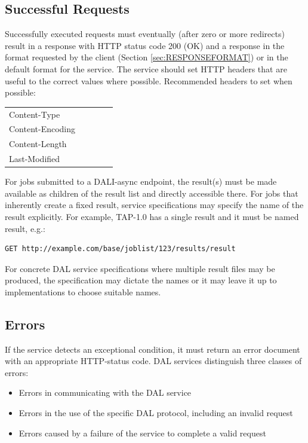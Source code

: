 \documentclass[11pt,letter]{ivoa}
\begin{document}
\subsection{Successful Requests}
\label{sec:response-ok}
Successfully executed requests must eventually (after zero or more redirects)
result in a response with HTTP status code 200 (OK) and a response in the format
requested by the client (Section \ref{sec:RESPONSEFORMAT}) or in the default format for the
service. The service should set HTTP headers \citep{std:HTTP} that are useful to the correct values
where possible. Recommended headers to set when possible:

\begin{tabular}{l l l l l}
\label{tab:headers}
Content-Type \\
Content-Encoding \\
Content-Length \\
Last-Modified \\
\end{tabular}

For jobs submitted to a DALI-async endpoint, the result(s) must be made
available as children of the result list and directly accessible there.
For jobs that inherently create a fixed result, service specifications may
specify the name of the result explicitly. For example, TAP-1.0 has a single
result and it must be named result, e.g.:

\begin{verbatim}
GET http://example.com/base/joblist/123/results/result
\end{verbatim}

For concrete DAL service specifications where multiple result files may be
produced, the specification may dictate the names or it may leave it up to
implementations to choose suitable names.

\subsection{Errors}
\label{sec:response-error}
If the service detects an exceptional condition, it must return an error
document with an appropriate HTTP-status code. DAL services distinguish three
classes of errors:

\begin{itemize}
\item Errors in communicating with the DAL service

\item Errors in the use of the specific DAL protocol, including an invalid
request

\item Errors caused by a failure of the service to complete a valid request
\end{itemize}
\end{document}
